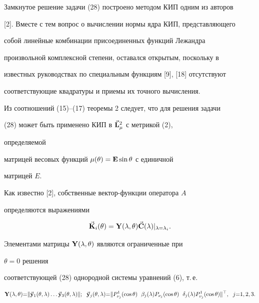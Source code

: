 \begin{exam}
 


Замкнутое решение задачи (28) построено методом КИП одним из авторов 


[2]. Вместе с тем вопрос о вычислении нормы ядра КИП, представляющего 


собой линейные комбинации присоединенных функций Лежандра 


произвольной комплексной степени, оставался открытым, поскольку в 


известных руководствах по специальным функциям [9], [18] отсутствуют 


соответствующие квадратуры и приемы их точного вычисления. 


 


Из соотношений (15)--(17) теоремы 2 следует, что для решения задачи 


(28) может быть применено КИП в $\Vec{\bold{L}}^2_\mu$ с метрикой (2), 


определяемой 


матрицей весовых функций $\mu(\theta)=\bold E\sin\theta$ с единичной 


матрицей $E$. 


 


Как известно [2], собственные вектор-функции оператора $A$ 


определяются выражениями 


$$ 


\vb{K}_i(\theta)=\bold Y(\lambda,\theta)\vb{C}(\lambda) 


|_{\lambda=\lambda_i}. 


$$ 


Элементами матрицы $\bold Y(\lambda,\theta)$ являются ограниченные при 


$\theta=0$ решения 


соответствующей (28) однородной системы уравнений (6), т.\,е. 


$$ 


\bold Y(\lambda,\theta){=}\|\vb{y}_1(\theta,\lambda)\dotsc 


\vb{y}_3(\theta,\lambda)\|;\ \;


\vb{y}_j(\theta,\lambda){=}\|P^1_{\nu_j}(\cos\theta)\ \; 


\beta_j(\lambda)P_{\nu_j}(\cos\theta)\ \; 


\delta_j(\lambda)P^1_{\nu_j}(\cos\theta)\|^\top,\ \;


j{=}1,2,3. 


$$ 



\end{exam}
